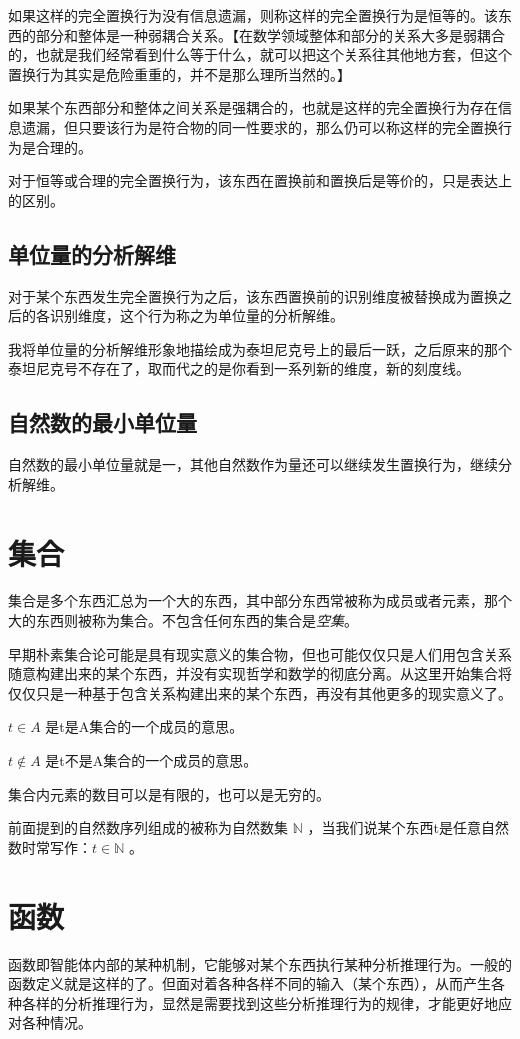 \documentclass[12pt,oneside]{book}
\begin{document}
如果这样的完全置换行为没有信息遗漏，则称这样的完全置换行为是恒等的。该东西的部分和整体是一种弱耦合关系。【在数学领域整体和部分的关系大多是弱耦合的，也就是我们经常看到什么等于什么，就可以把这个关系往其他地方套，但这个置换行为其实是危险重重的，并不是那么理所当然的。】

如果某个东西部分和整体之间关系是强耦合的，也就是这样的完全置换行为存在信息遗漏，但只要该行为是符合物的同一性要求的，那么仍可以称这样的完全置换行为是合理的。

对于恒等或合理的完全置换行为，该东西在置换前和置换后是等价的，只是表达上的区别。


\subsection{单位量的分析解维}
对于某个东西发生完全置换行为之后，该东西置换前的识别维度被替换成为置换之后的各识别维度，这个行为称之为单位量的分析解维。

我将单位量的分析解维形象地描绘成为泰坦尼克号上的最后一跃，之后原来的那个泰坦尼克号不存在了，取而代之的是你看到一系列新的维度，新的刻度线。

\subsection{自然数的最小单位量}
自然数的最小单位量就是一，其他自然数作为量还可以继续发生置换行为，继续分析解维。


\section{集合}
集合是多个东西汇总为一个大的东西，其中部分东西常被称为成员或者元素，那个大的东西则被称为集合。不包含任何东西的集合是\textit{空集}。

早期朴素集合论可能是具有现实意义的集合物，但也可能仅仅只是人们用包含关系随意构建出来的某个东西，并没有实现哲学和数学的彻底分离。从这里开始集合将仅仅只是一种基于包含关系构建出来的某个东西，再没有其他更多的现实意义了。

$t \in A$ 是t是A集合的一个成员的意思。

$t \notin A$ 是t不是A集合的一个成员的意思。

集合内元素的数目可以是有限的，也可以是无穷的。

前面提到的自然数序列组成的被称为自然数集 $ \mathbb{N} $ ，当我们说某个东西t是任意自然数时常写作：$ t \in \mathbb{N} $ 。

\section{函数}
函数即智能体内部的某种机制，它能够对某个东西执行某种分析推理行为。一般的函数定义就是这样的了。但面对着各种各样不同的输入（某个东西），从而产生各种各样的分析推理行为，显然是需要找到这些分析推理行为的规律，才能更好地应对各种情况。
\end{document}
